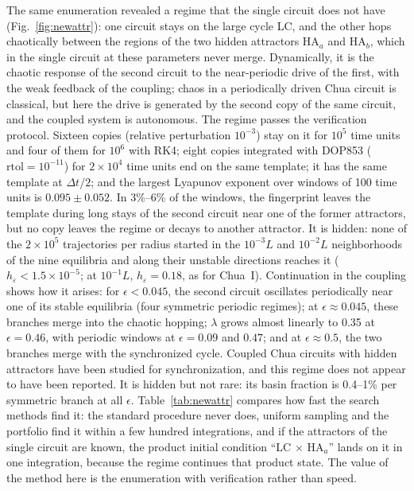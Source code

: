 The same enumeration revealed a regime that the single circuit does not have (Fig.~\ref{fig:newattr}): one circuit stays on the large cycle LC, and the other hops chaotically between the regions of the two hidden attractors HA$_a$ and HA$_b$, which in the single circuit at these parameters never merge.\cite{Stankevich2017} Dynamically, it is the chaotic response of the second circuit to the near-periodic drive of the first, with the weak feedback of the coupling; chaos in a periodically driven Chua circuit is classical,\cite{Murali1991DrivenChua} but here the drive is generated by the second copy of the same circuit, and the coupled system is autonomous. The regime passes the verification protocol. Sixteen copies (relative perturbation $10^{-3}$) stay on it for $10^5$ time units and four of them for $10^6$ with RK4; eight copies integrated with DOP853 ($\mathrm{rtol}=10^{-11}$) for $2\times10^4$ time units end on the same template; it has the same template at $\Delta t/2$; and the largest Lyapunov exponent over windows of 100 time units is $0.095\pm0.052$. In 3\%--6\% of the windows, the fingerprint leaves the template during long stays of the second circuit near one of the former attractors, but no copy leaves the regime or decays to another attractor. It is hidden: none of the $2\times10^5$ trajectories per radius started in the $10^{-3}L$ and $10^{-2}L$ neighborhoods of the nine equilibria and along their unstable directions reaches it ($h_\varepsilon<1.5\times10^{-5}$; at $10^{-1}L$, $h_\varepsilon=0.18$, as for Chua~I). Continuation in the coupling shows how it arises: for $\epsilon<0.045$, the second circuit oscillates periodically near one of its stable equilibria (four symmetric periodic regimes); at $\epsilon\approx0.045$, these branches merge into the chaotic hopping; $\lambda$ grows almost linearly to 0.35 at $\epsilon=0.46$, with periodic windows at $\epsilon=0.09$ and $0.47$; and at $\epsilon\approx0.5$, the two branches merge with the synchronized cycle. Coupled Chua circuits with hidden attractors have been studied for synchronization,\cite{Stankevich2017,Kuznetsov2023Chua} and this regime does not appear to have been reported. It is hidden but not rare: its basin fraction is 0.4--1\% per symmetric branch at all $\epsilon$. Table~\ref{tab:newattr} compares how fast the search methods find it: the standard procedure never does, uniform sampling and the portfolio find it within a few hundred integrations, and if the attractors of the single circuit are known, the product initial condition ``LC $\times$ HA$_a$'' lands on it in one integration, because the regime continues that product state. The value of the method here is the enumeration with verification rather than speed.


